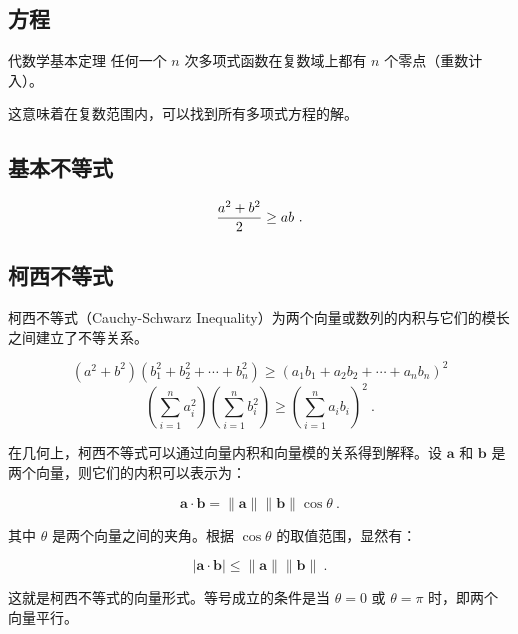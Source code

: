 
\begin{issues}
\issueDraft
\end{issues}

\subsection{方程}


\begin{definition}{代数学基本定理}
任何一个 $n$ 次多项式函数在复数域上都有 $n$ 个零点（重数计入）。
\end{definition}
这意味着在复数范围内，可以找到所有多项式方程的解。

\subsection{基本不等式}

\begin{equation}
{a^2+b^2\over2}\geq ab~.
\end{equation}

\subsection{柯西不等式}

柯西不等式（Cauchy-Schwarz Inequality）为两个向量或数列的内积与它们的模长之间建立了不等关系。



\begin{equation}
\left( a^2 + b^2\right) \left( b_1^2 + b_2^2 + \cdots + b_n^2 \right) \geq \left( a_1 b_1 + a_2 b_2 + \cdots + a_n b_n \right)^2
\end{equation}
\begin{equation}
\left( \sum_{i=1}^{n} a_i^2 \right) \left( \sum_{i=1}^{n} b_i^2 \right) \geq \left( \sum_{i=1}^{n} a_i b_i \right)^2~.
\end{equation}

在几何上，柯西不等式可以通过向量内积和向量模的关系得到解释。设 $\mathbf{a}$ 和 $\mathbf{b}$ 是两个向量，则它们的内积可以表示为：

$$\mathbf{a} \cdot \mathbf{b} = \|\mathbf{a}\| \|\mathbf{b}\| \cos \theta~.$$

其中 $\theta$ 是两个向量之间的夹角。根据 $\cos \theta$ 的取值范围，显然有：

$$|\mathbf{a} \cdot \mathbf{b}| \leq \|\mathbf{a}\| \|\mathbf{b}\|~.$$

这就是柯西不等式的向量形式。等号成立的条件是当 $\theta = 0$ 或 $\theta = \pi$ 时，即两个向量平行。

